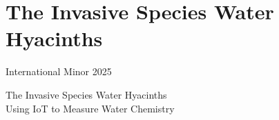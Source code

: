 \part[nopartpage]{The Invasive Species Water Hyacinths}

\begin{frame}
\centering
\vfill
{\color{fh-ooe-red}\Huge International Minor 2025\par}
\vspace{1em}
{\color{fh-ooe-red}\Large The Invasive Species Water Hyacinths\\Using IoT to Measure Water Chemistry\par}
\vfill
\end{frame}

